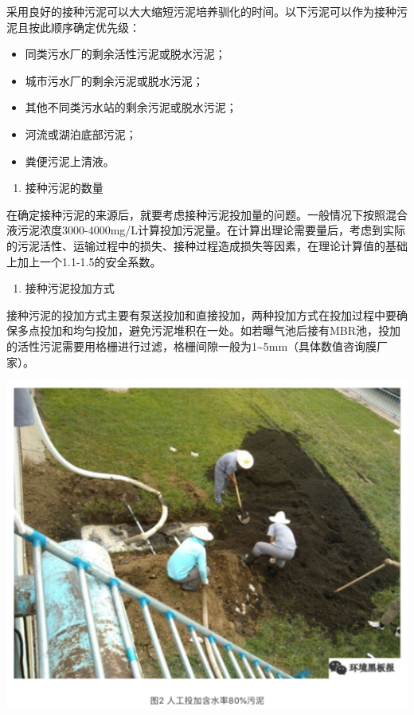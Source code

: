 \documentclass[]{book}
\providecommand{\tightlist}{%
  \setlength{\itemsep}{0pt}\setlength{\parskip}{0pt}}
\begin{document}
采用良好的接种污泥可以大大缩短污泥培养驯化的时间。以下污泥可以作为接种污泥且按此顺序确定优先级：

\begin{itemize}
\item
  同类污水厂的剩余活性污泥或脱水污泥；
\item
  城市污水厂的剩余污泥或脱水污泥；
\item
  其他不同类污水站的剩余污泥或脱水污泥；
\item
  河流或湖泊底部污泥；
\item
  粪便污泥上清液。
\end{itemize}

\begin{enumerate}
\def\labelenumi{\arabic{enumi}.}
\setcounter{enumi}{1}
\tightlist
\item
  接种污泥的数量
\end{enumerate}

在确定接种污泥的来源后，就要考虑接种污泥投加量的问题。一般情况下按照混合液污泥浓度3000-4000mg/L计算投加污泥量。在计算出理论需要量后，考虑到实际的污泥活性、运输过程中的损失、接种过程造成损失等因素，在理论计算值的基础上加上一个1.1-1.5的安全系数。

\begin{enumerate}
\def\labelenumi{\arabic{enumi}.}
\setcounter{enumi}{2}
\tightlist
\item
  接种污泥投加方式
\end{enumerate}

接种污泥的投加方式主要有泵送投加和直接投加，两种投加方式在投加过程中要确保多点投加和均匀投加，避免污泥堆积在一处。如若曝气池后接有MBR池，投加的活性污泥需要用格栅进行过滤，格栅间隙一般为1\textasciitilde{}5mm（具体数值咨询膜厂家）。

\includegraphics[width=6.67in]{images/ao2}
\end{document}
